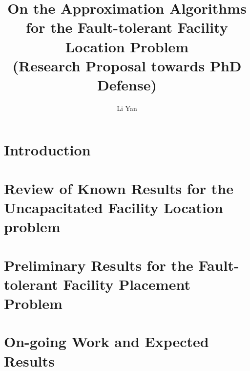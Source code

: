 \documentclass{article}
\title{On the Approximation Algorithms for the Fault-tolerant Facility Location Problem\\(Research Proposal towards PhD Defense)}
\author{Li Yan}
\begin{document}
\maketitle

\section{Introduction}
\section{Review of Known Results for the Uncapacitated Facility
  Location problem}
\section{Preliminary Results for the Fault-tolerant Facility Placement Problem}
\section{On-going Work and Expected Results}
\end{document}
